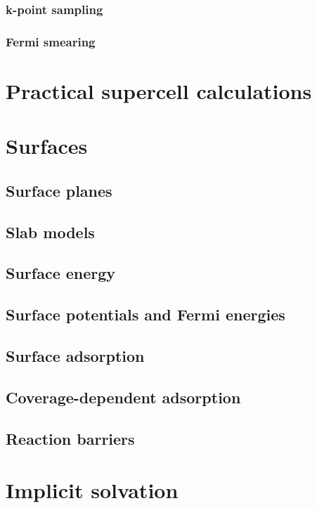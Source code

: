 \documentclass[11pt]{article}
\begin{document}
\subsubsection{k-point sampling}
\label{sec:orgac1b890}
\subsubsection{Fermi smearing}
\label{sec:org5b24534}
\newpage
\section{Practical supercell calculations}
\label{sec:orgb8034be}
\newpage
\section{Surfaces}
\label{sec:org0869c2f}
\subsection{Surface planes}
\label{sec:orgb4e1997}
\subsection{Slab models}
\label{sec:orgfff451d}
\subsection{Surface energy}
\label{sec:org850d600}
\subsection{Surface potentials and Fermi energies}
\label{sec:orgf911235}
\subsection{Surface adsorption}
\label{sec:org66e0397}
\subsection{Coverage-dependent adsorption}
\label{sec:org77acce6}
\subsection{Reaction barriers}
\label{sec:orgc8f4d30}

\newpage
\section{Implicit solvation}
\label{sec:org706b261}
\end{document}
